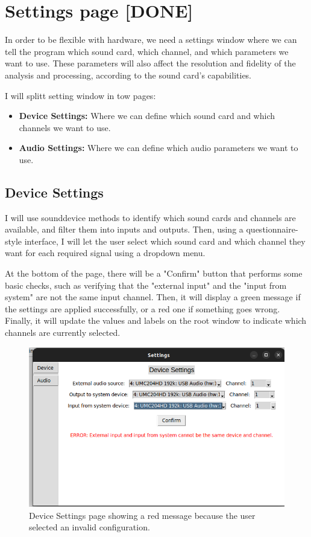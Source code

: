 \section{Settings page [DONE]}

In order to be flexible with hardware, we need a settings window where we can tell the program which sound card, which channel, and which parameters we want to use. These parameters will also affect the resolution and fidelity of the analysis and processing, according to the sound card’s capabilities.

I will splitt setting window in tow pages:
 \begin{itemize}
 	\item \textbf{Device Settings:} Where we can define which sound card and which channels we want to use.
 	\item \textbf{Audio Settings:} Where we can define which audio parameters we want to use.
 \end{itemize}

\subsection{Device Settings}

I will use sounddevice methods to identify which sound cards and channels are available, and filter them into inputs and outputs. Then, using a questionnaire-style interface, I will let the user select which sound card and which channel they want for each required signal using a dropdown menu.

At the bottom of the page, there will be a "Confirm" button that performs some basic checks, such as verifying that the "external input" and the "input from system" are not the same input channel. Then, it will display a green message if the settings are applied successfully, or a red one if something goes wrong. Finally, it will update the values and labels on the root window to indicate which channels are currently selected.

\begin{figure}[H]
	\centering
	\includegraphics[width=0.8
	\linewidth]{Figures/DevSet.png}
	\caption{Device Settings page showing a red message because the user selected an invalid configuration.}
	\label{fig:Device Settings}
\end{figure}


